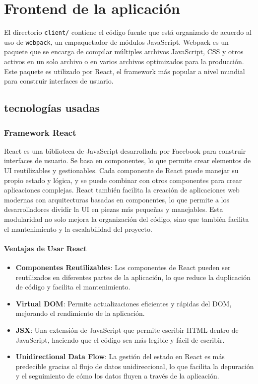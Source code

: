 \section{Frontend de la aplicación}
El directorio \texttt{client/} contiene el código fuente que está organizado de acuerdo al uso de \texttt{webpack}, un empaquetador de módulos JavaScript. Webpack es un paquete que se encarga de compilar múltiples archivos JavaScript, CSS y otros activos en un solo archivo o en varios archivos optimizados para la producción. Este paquete es utilizado por React, el framework más popular a nivel mundial para construir interfaces de usuario.

\subsection{tecnologías usadas}
\subsubsection{Framework React}
React es una biblioteca de JavaScript desarrollada por Facebook para construir interfaces de usuario. Se basa en componentes, lo que permite crear elementos de UI reutilizables y gestionables. Cada componente de React puede manejar su propio estado y lógica, y se puede combinar con otros componentes para crear aplicaciones complejas. 
\singlespacing
React también facilita la creación de aplicaciones web modernas con arquitecturas basadas en componentes, lo que permite a los desarrolladores dividir la UI en piezas más pequeñas y manejables. Esta modularidad no solo mejora la organización del código, sino que también facilita el mantenimiento y la escalabilidad del proyecto.

\paragraph{Ventajas de Usar React}
\begin{itemize}
  \item \textbf{Componentes Reutilizables}: Los componentes de React pueden ser reutilizados en diferentes partes de la aplicación, lo que reduce la duplicación de código y facilita el mantenimiento.
  \item \textbf{Virtual DOM}: Permite actualizaciones eficientes y rápidas del DOM, mejorando el rendimiento de la aplicación.
  \item \textbf{JSX}: Una extensión de JavaScript que permite escribir HTML dentro de JavaScript, haciendo que el código sea más legible y fácil de escribir.
  \item \textbf{Unidirectional Data Flow}: La gestión del estado en React es más predecible gracias al flujo de datos unidireccional, lo que facilita la depuración y el seguimiento de cómo los datos fluyen a través de la aplicación.
\end{itemize}

